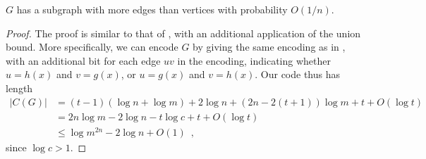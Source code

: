 \documentclass{patmorin}
\begin{document}
%

\begin{lem}
  $G$ has a subgraph with more edges than vertices with probability
  $O(1/n)$.
\end{lem}
\begin{proof}
  The proof is similar to that of , with an
  additional application of the union bound. More specifically, we can
  encode $G$ by giving the same encoding as in
  , with an additional bit for each edge $uv$
  in the encoding, indicating whether $u = h(x)$ and $v = g(x)$, or
  $u = g(x)$ and $v = h(x)$. Our code thus has length
  \begin{align*}
    |C(G)| &= (t - 1)(\log n + \log m) + 2 \log n + (2n - 2(t + 1))\log m + t + O(\log t) \\
    &= 2n \log m - 2 \log n - t \log c + t + O(\log t) \\
    &\le \log m^{2n} - 2 \log n + O(1) \enspace ,
  \end{align*}
  since $\log c > 1$.
\end{proof}
\end{document}
